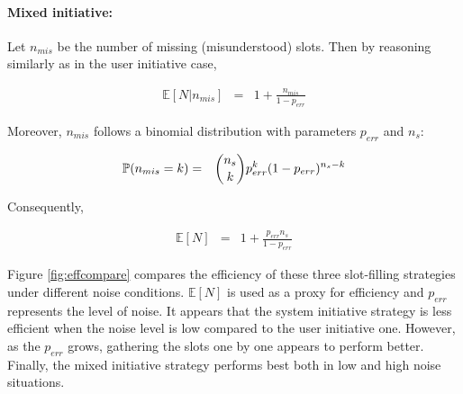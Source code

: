                 \paragraph{Mixed initiative:} Let $n_{mis}$ be the number of missing (misunderstood) slots. Then by reasoning similarly as in the user initiative case,
								
											\begin{eqnarray}
												\mathbb{E} [N | n_{mis}] & = & 1 + \frac{n_{mis}}{1-p_{err}}
											\end{eqnarray}

                     Moreover, $n_{mis}$ follows a binomial distribution with parameters $p_{err}$ and $n_s$:
										
											\begin{eqnarray}
												\mathbb{P} (n_{mis} = k) & = & \dbinom{n_s}{k} p_{err}^k (1-p_{err})^{n_s-k}
											\end{eqnarray}
										
										Consequently,

                     \begin{eqnarray}
                       \mathbb{E} [N] & = & 1 + \frac{p_{err} n_s}{1-p_{err}}
                     \end{eqnarray}
										
								Figure \ref{fig:effcompare} compares the efficiency of these three slot-filling strategies under different noise conditions. $\mathbb{E} [N]$ is used as a proxy for efficiency and $p_{err}$ represents the level of noise. It appears that the system initiative strategy is less efficient when the noise level is low compared to the user initiative one. However, as the $p_{err}$ grows, gathering the slots one by one appears to perform better. Finally, the mixed initiative strategy performs best both in low and high noise situations.
								
